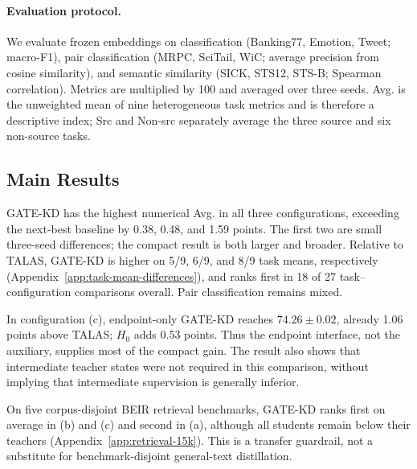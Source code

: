 \paragraph{Evaluation protocol.}
We evaluate frozen embeddings on classification (Banking77, Emotion, Tweet;
macro-F1), pair classification (MRPC, SciTail, WiC; average precision from
cosine similarity), and semantic similarity (SICK, STS12, STS-B; Spearman
correlation). Metrics are multiplied by 100 and averaged over three seeds.
Avg. is the unweighted mean of nine heterogeneous task metrics and is therefore
a descriptive index; Src and Non-src separately average the three source and
six non-source tasks.

\subsection{Main Results}
\label{sec:main-results}



GATE-KD has the highest numerical Avg. in all three configurations, exceeding
the next-best baseline by 0.38, 0.48, and 1.59 points. The first two are small
three-seed differences; the compact result is both larger and broader. Relative
to TALAS, GATE-KD is higher on 5/9, 6/9, and 8/9 task means, respectively
(Appendix~\ref{app:task-mean-differences}), and ranks first in 18 of 27
task--configuration comparisons overall. Pair classification remains mixed.

In configuration (c), endpoint-only GATE-KD reaches $74.26\pm0.02$, already
1.06 points above TALAS; $H_0$ adds 0.53 points. Thus the endpoint interface,
not the auxiliary, supplies most of the compact gain. The result also shows
that intermediate teacher states were not required in this comparison, without
implying that intermediate supervision is generally inferior.

On five corpus-disjoint BEIR retrieval benchmarks, GATE-KD ranks first on
average in (b) and (c) and second in (a), although all students remain below
their teachers (Appendix~\ref{app:retrieval-15k}). This is a transfer guardrail,
not a substitute for benchmark-disjoint general-text distillation.

\FloatBarrier
